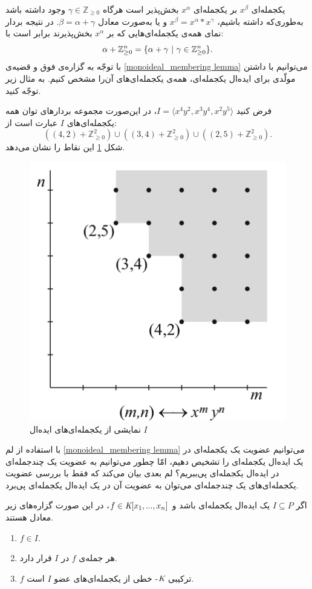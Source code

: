 یکجمله‌ای 
$x^{\beta}$
بر یکجمله‌ای 
$x^{\alpha}$
بخش‌پذیر است هرگاه 
$\gamma\in \mathbb{Z}_{\geq 0}$
وجود داشته باشد به‌طوری‌که داشته باشیم، 
$x^{\beta} = x^{\alpha}*x^{\gamma}$
و یا به‌صورت معادل
$\beta = \alpha + \gamma$.
 در نتیجه بردار نمای همه‌ی یکجمله‌ای‌هایی که بر 
$x^{\alpha}$
بخش‌پذیرند برابر است با:
$$\alpha + \mathbb{Z}_{\geq 0}^{n} = \{\alpha + \gamma \ | \ \gamma\in\mathbb{Z}_{\geq 0}^{n}\}.$$
با توجّه به گزاره‌ی فوق و قضیه‌ی 
\ref{monoideal_membering lemma}
می‌توانیم با داشتن مولّدی برای ایده‌ال یکجمله‌ای، همه‌ی یکجمله‌ای‌های آن‌را مشخص کنیم. به مثال زیر توجّه کنید.
\begin{example}
فرض کنید 
$I = \langle x^{4}y^{2}, x^{3}y^{4}, x^{2}y^{5}\rangle$،
در این‌صورت مجموعه   بردارهای توان همه‌  یکجمله‌ای‌های 
$I$
عبارت است از:
$$((4,2) + \mathbb{Z}_{\geq 0}^{2}) \cup ((3,4) + \mathbb{Z}_{\geq 0}^{2})\cup ((2, 5) + \mathbb{Z}_{\geq 0}^{2}).$$
شکل 
\ref{fig:monomialidealvisualization}
این نقاط را نشان می‌دهد.
\begin{figure}[H]
\centering
\includegraphics[width=0.4\linewidth]{Images/monomialideal_visualization}
\caption{نمایشی از یکجمله‌ای‌های ایده‌ال 
	$I$}
\label{fig:monomialidealvisualization}
\end{figure}

\end{example}
با استفاده از لم
\ref{monoideal_membering lemma}
می‌توانیم عضویت یک یکجمله‌ای در یک ایده‌ال یکجمله‌ای را تشخیص دهیم، امّا چطور می‌توانیم به عضویت یک چندجمله‌ای در ایده‌ال یکجمله‌ای پی‌ببریم؟ لم بعدی بیان می‌کند که فقط با بررسی عضویت یکجمله‌ای‌های یک چند‌جمله‌ای می‌توان به عضویت آن در یک ایده‌ال یکجمله‌ای پی‌برد.
\begin{lemma}
اگر
{\small $I\subseteq P$}
یک ایده‌ال یکجمله‌ای  باشد و 
{\small $f\in \textit{K}[x_{1},...,x_{n}]$}،
 در این صورت گزاره‌های زیر معادل‌‌ هستند.
\begin{enumerate}
\item
$f\in I$.
\item
هر جمله‌‌ی
$f$
در 
$I$
قرار دارد.
\item
$f$
ترکیبی 
$\textit{K}$-
خطی از یکجمله‌ای‌های عضو 
$I$
است.
\end{enumerate}
\end{lemma}
